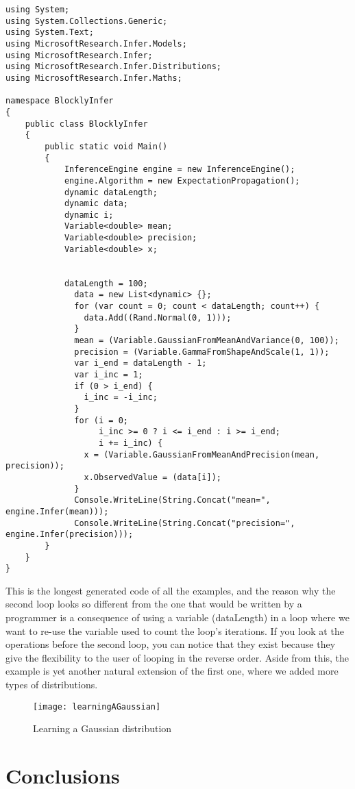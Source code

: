 \begin{lstlisting}
using System;
using System.Collections.Generic;
using System.Text;
using MicrosoftResearch.Infer.Models;
using MicrosoftResearch.Infer;
using MicrosoftResearch.Infer.Distributions;
using MicrosoftResearch.Infer.Maths;

namespace BlocklyInfer
{
	public class BlocklyInfer
	{
		public static void Main()
		{
			InferenceEngine engine = new InferenceEngine();
			engine.Algorithm = new ExpectationPropagation();
			dynamic dataLength;
			dynamic data;
			dynamic i;
			Variable<double> mean;
			Variable<double> precision;
			Variable<double> x;


			dataLength = 100;
			  data = new List<dynamic> {};
			  for (var count = 0; count < dataLength; count++) {
			    data.Add((Rand.Normal(0, 1)));
			  }
			  mean = (Variable.GaussianFromMeanAndVariance(0, 100));
			  precision = (Variable.GammaFromShapeAndScale(1, 1));
			  var i_end = dataLength - 1;
			  var i_inc = 1;
			  if (0 > i_end) {
			    i_inc = -i_inc;
			  }
			  for (i = 0;
			       i_inc >= 0 ? i <= i_end : i >= i_end;
			       i += i_inc) {
			    x = (Variable.GaussianFromMeanAndPrecision(mean, precision));
			    x.ObservedValue = (data[i]);
			  }
			  Console.WriteLine(String.Concat("mean=", engine.Infer(mean)));
			  Console.WriteLine(String.Concat("precision=", engine.Infer(precision)));
		}
	}
}
\end{lstlisting}

This is the longest generated code of all the examples, and the reason why the
second loop looks so different from the one that would be written by a programmer
is a consequence of using a variable (dataLength) in a loop where we want to
re-use the variable used to count the loop's iterations. If you look at the
operations before the second loop, you can notice that they exist because they
give the flexibility to the user of looping in the reverse order. Aside from
this, the example is yet another natural extension of the first one, where we
added more types of distributions.

\begin{figure}[t]
  \begin{center}
    \leavevmode
    \texttt{[image: learningAGaussian]}
    \caption{Learning a Gaussian distribution}
    \label{fig:learningAGaussian}
  \end{center}
\end{figure}

\section{Conclusions}

